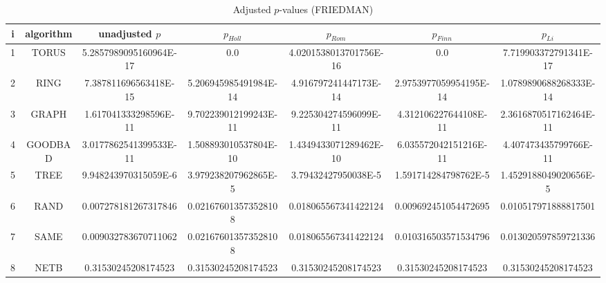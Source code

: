 \documentclass[a4paper,10pt]{article}
\begin{document}
\begin{landscape}
\begin{table}[!htp]
\centering\scriptsize
\caption{Adjusted $p$-values (FRIEDMAN)}
\begin{tabular}{ccccccc}
i&algorithm&unadjusted $p$&$p_{Holl}$&$p_{Rom}$&$p_{Finn}$&$p_{Li}$\\
\hline
1& TORUS&5.2857989095160964E-17&0.0&4.0201538013701756E-16&0.0&7.719903372791341E-17\\
2& RING&7.387811696563418E-15&5.206945985491984E-14&4.916797241447173E-14&2.9753977059954195E-14&1.0789890688268333E-14\\
3& GRAPH&1.617041333298596E-11&9.702239012199243E-11&9.225304274596099E-11&4.312106227644108E-11&2.3616870517162464E-11\\
4& GOODBAD&3.0177862541399533E-11&1.508893010537804E-10&1.4349433071289462E-10&6.035572042151216E-11&4.407473435799766E-11\\
5& TREE&9.948243970315059E-6&3.979238207962865E-5&3.79432427950038E-5&1.591714284798762E-5&1.4529188049020656E-5\\
6& RAND&0.007278181267317846&0.021676013573528108&0.018065567341422124&0.009692451054472695&0.010517971888817501\\
7& SAME&0.009032783670711062&0.021676013573528108&0.018065567341422124&0.010316503571534796&0.013020597859721336\\
8& NETB&0.31530245208174523&0.31530245208174523&0.31530245208174523&0.31530245208174523&0.31530245208174523\\
\hline
\end{tabular}
\end{table}


\newpage


\end{landscape}
\end{document}
